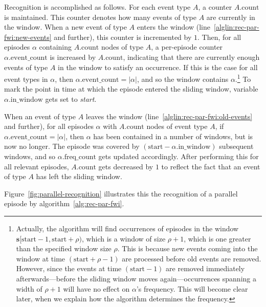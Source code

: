 Recognition is accomplished as follows. For each event type $ A $, a counter $ A \text{.count} $ is maintained. This counter denotes how many events of type $ A $ are currently in the window. When a new event of type $ A $ enters the window (line~\ref{alglin:rec-par-fwi:new-events} and further), this counter is incremented by $ 1 $. Then, for all episodes $ \alpha $ containing $ A \text{.count} $ nodes of type $ A $, a per-episode counter $ \alpha \text{.event\_count} $ is increased by $ A \text{.count} $, indicating that there are currently enough events of type $ A $ in the window to satisfy an occurrence. If this is the case for all event types in $ \alpha $, then $ \alpha \text{.event\_count} = | \alpha | $, and so the window contains $ \alpha $.\footnote{\label{footnote:false-recognition}Actually, the algorithm will find occurrences of episodes in the window $ \boldsymbol{s}[\text{start} - 1, \text{start} + \rho) $, which is a window of size $ \rho + 1 $, which is one greater than the specified window size $ \rho $. This is because new events coming into the window at time $ (\text{start} + \rho - 1) $ are processed before old events are removed. However, since the events at time $ (\text{start} - 1) $ are removed immediately afterwards---before the sliding window moves again---occurrences spanning a width of $ \rho + 1 $ will have no effect on $ \alpha $'s frequency. This will become clear later, when we explain how the algorithm determines the frequency.} To mark the point in time at which the episode entered the sliding window, variable $ \alpha \text{.in\_window} $ gets set to \emph{start}.

When an event of type $ A $ leaves the window (line~\ref{alglin:rec-par-fwi:old-events} and further), for all episodes $ \alpha $ with $ A \text{.count} $ nodes of event type $ A $, if $ \alpha \text{.event\_count} = | \alpha | $, then $ \alpha $ has been contained in a number of windows, but is now no longer. The episode was covered by $ (\text{start} - \alpha \text{.in\_window}) $ subsequent windows, and so $ \alpha \text{.freq\_count} $ gets updated accordingly. After performing this for all relevant episodes, $ A \text{.count} $ gets decreased by $ 1 $ to reflect the fact that an event of type $ A $ has left the sliding window.

Figure~\ref{fig:parallel-recognition} illustrates this the recognition of a parallel episode by algorithm~\ref{alg:rec-par-fwi}.

